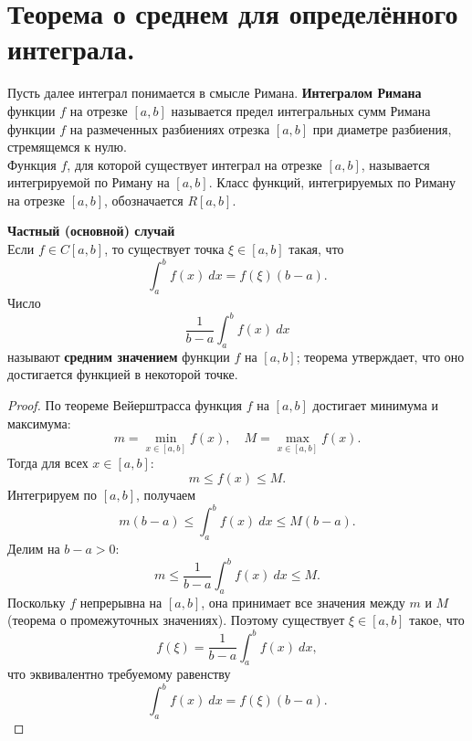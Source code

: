 \documentclass[14pt]{extreport}
\begin{document}
\chapter{Теорема о среднем для определённого интеграла.}

    \begin{definition}
        Пусть далее интеграл понимается в смысле Римана. \textbf{Интегралом Римана} функции $f$ на отрезке $[a, b]$ называется предел интегральных сумм Римана функции $f$ на размеченных разбиениях отрезка $[a, b]$ при диаметре разбиения, стремящемся к нулю.\\
        Функция $f$, для которой существует интеграл на отрезке $[a, b]$, называется интегрируемой по Риману на $[a, b]$. Класс функций, интегрируемых по Риману на отрезке $[a, b]$, обозначается $R[a, b]$. 
    \end{definition}

    \begin{theorem}
        \textbf{Частный (основной) случай}\\
        Если $f \in C[a,b]$, то существует точка $\xi \in [a,b]$ такая, что
        \[
        \int_a^b f(x)\ dx = f(\xi) (b-a).
        \]
        Число
        \[
        \frac{1}{b-a} \int_a^b f(x)\ dx
        \]
        называют \textbf{средним значением} функции $f$ на $[a,b]$; теорема утверждает, что оно достигается функцией в некоторой точке.
    \end{theorem}

    \begin{proof}
        По теореме Вейерштрасса функция $f$ на $[a,b]$ достигает минимума и максимума:
        \[
        m = \min_{x \in [a,b]} f(x), \quad M = \max_{x \in [a,b]} f(x).
        \]
        Тогда для всех $x \in [a,b]$:
        \[
        m \leq f(x) \leq M.
        \]
        Интегрируем по $[a,b]$, получаем
        \[
        m(b-a) \leq \int_a^b f(x)\ dx \leq M(b-a).
        \]
        Делим на $b-a>0$:
        \[
        m \leq \frac{1}{b-a} \int_a^b f(x)\ dx \leq M.
        \]
        Поскольку $f$ непрерывна на $[a,b]$, она принимает все значения между $m$ и $M$ (теорема о промежуточных значениях). Поэтому существует $\xi \in [a,b]$ такое, что 
        \[
        f(\xi) = \frac{1}{b-a} \int_a^b f(x)\ dx,
        \]
        что эквивалентно требуемому равенству
        \[
        \int_a^b f(x)\ dx = f(\xi) (b-a).
        \]
    \end{proof}
\end{document}
